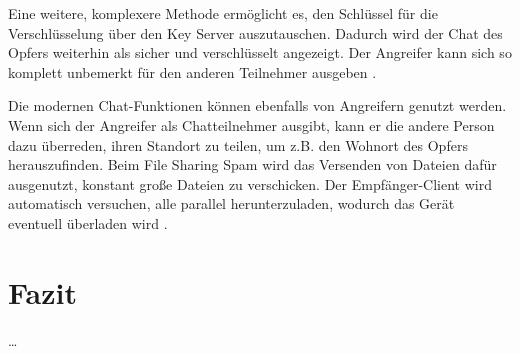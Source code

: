 \documentclass[conference]{IEEEtran}
\begin{document}
Eine weitere, komplexere Methode ermöglicht es, den Schlüssel für die Verschlüsselung über den Key Server auszutauschen.
Dadurch wird der Chat des Opfers weiterhin als sicher und verschlüsselt angezeigt.
Der Angreifer kann sich so komplett unbemerkt für den anderen Teilnehmer ausgeben \cite{5gmsg}.

Die modernen Chat-Funktionen können ebenfalls von Angreifern genutzt werden.
Wenn sich der Angreifer als Chatteilnehmer ausgibt, kann er die andere Person dazu überreden, ihren Standort zu teilen, um z.B. den Wohnort des Opfers herauszufinden.
Beim File Sharing Spam wird das Versenden von Dateien dafür ausgenutzt, konstant große Dateien zu verschicken.
Der Empfänger-Client wird automatisch versuchen, alle parallel herunterzuladen, wodurch das Gerät eventuell überladen wird \cite{5gmsg}.


\section{Fazit}

\dots
\end{document}

